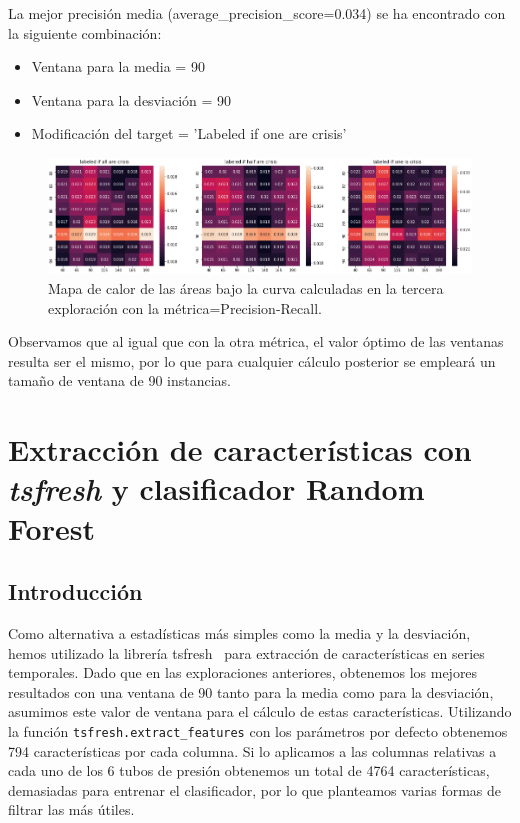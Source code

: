 \documentclass[a4paper,12pt,twoside,oldfontcommands]{memoir}
\begin{document}
La mejor precisión media (average\_precision\_score=0.034) se ha encontrado con la siguiente combinación: 
\begin{itemize}
    \item Ventana para la media = 90
    \item Ventana para la desviación = 90
    \item Modificación del target = 'Labeled if one are crisis'
\end{itemize}

\begin{figure}
    \centering
    \includegraphics[width=1\textwidth]{images/heatmap6.png}
    \caption{Mapa de calor de las áreas bajo la curva calculadas en la tercera exploración con la métrica=Precision-Recall.}
    \label{fig:heatmap6}
\end{figure}

Observamos que al igual que con la otra métrica, el valor óptimo de las ventanas resulta ser el mismo, por lo que para cualquier cálculo posterior se empleará un tamaño de ventana de 90 instancias. 

\chapter{Extracción de características con \textit{tsfresh} y clasificador Random Forest}
\section{Introducción}
Como alternativa a estadísticas más simples como la media y la desviación, hemos utilizado la librería tsfresh~\cite{christ2018time} para extracción de características en series temporales. Dado que en las exploraciones anteriores, obtenemos los mejores resultados con una ventana de 90 tanto para la media como para la desviación, asumimos este valor de ventana para el cálculo de estas características. Utilizando la función \texttt{tsfresh.extract\_features} con los parámetros por defecto obtenemos 794 características por cada columna. Si lo aplicamos a las columnas relativas a cada uno de los 6 tubos de presión obtenemos un total de 4764 características, demasiadas para entrenar el clasificador, por lo que planteamos varias formas de filtrar las más útiles. 
\end{document}
